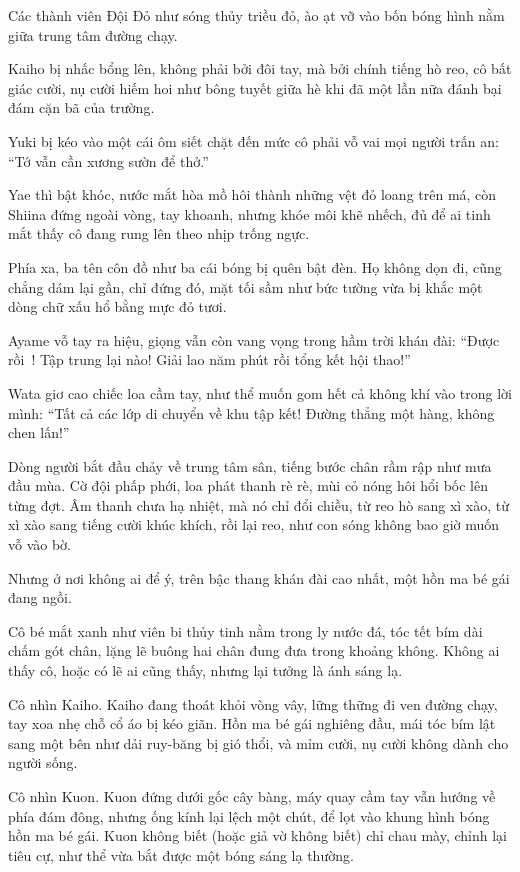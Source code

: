 \documentclass[../main.tex]{subfiles}
\begin{document}
Các thành viên Đội Đỏ như sóng thủy triều đỏ, ào ạt vỡ vào bốn bóng hình nằm giữa trung tâm đường chạy.

Kaiho bị nhấc bổng lên, không phải bởi đôi tay, mà bởi chính tiếng hò reo, cô bất giác cười, nụ cười hiếm hoi như bông tuyết giữa hè khi đã một lần nữa đánh bại đám cặn bã của trường.

Yuki bị kéo vào một cái ôm siết chặt đến mức cô phải vỗ vai mọi người trấn an: ``Tớ vẫn cần xương sườn để thở.''

Yae thì bật khóc, nước mắt hòa mồ hôi thành những vệt đỏ loang trên má, còn Shiina đứng ngoài vòng, tay khoanh, nhưng khóe môi khẽ nhếch, đủ để ai tinh mắt thấy cô đang rung lên theo nhịp trống ngực.

Phía xa, ba tên côn đồ như ba cái bóng bị quên bật đèn. Họ không dọn đi, cũng chẳng dám lại gần, chỉ đứng đó, mặt tối sầm như bức tường vừa bị khắc một dòng chữ xấu hổ bằng mực đỏ tươi.

Ayame vỗ tay ra hiệu, giọng vẫn còn vang vọng trong hầm trời khán đài: ``Được rồi~! Tập trung lại nào! Giải lao năm phút rồi tổng kết hội thao!''

Wata giơ cao chiếc loa cầm tay, như thể muốn gom hết cả không khí vào trong lời mình: ``Tất cả các lớp di chuyển về khu tập kết! Đường thẳng một hàng, không chen lấn!''

Dòng người bắt đầu chảy về trung tâm sân, tiếng bước chân rầm rập như mưa đầu mùa. Cờ đội phấp phới, loa phát thanh rè rè, mùi cỏ nóng hôi hổi bốc lên từng đợt. Âm thanh chưa hạ nhiệt, mà nó chỉ đổi chiều, từ reo hò sang xì xào, từ xì xào sang tiếng cười khúc khích, rồi lại reo, như con sóng không bao giờ muốn vỗ vào bờ.

\il

Nhưng ở nơi không ai để ý,
trên bậc thang khán đài cao nhất,
một hồn ma bé gái đang ngồi.

Cô bé mắt xanh như viên bi thủy tinh nằm trong ly nước đá, tóc tết bím dài chấm gót chân, lặng lẽ buông hai chân đung đưa trong khoảng không.
Không ai thấy cô, hoặc có lẽ ai cũng thấy, nhưng lại tưởng là ánh sáng lạ.

Cô nhìn Kaiho.
Kaiho đang thoát khỏi vòng vây, lững thững đi ven đường chạy, tay xoa nhẹ chỗ cổ áo bị kéo giãn.
Hồn ma bé gái nghiêng đầu, mái tóc bím lật sang một bên như dải ruy-băng bị gió thổi, và mỉm cười, nụ cười không dành cho người sống.

Cô nhìn Kuon.
Kuon đứng dưới gốc cây bàng, máy quay cầm tay vẫn hướng về phía đám đông, nhưng ống kính lại lệch một chút, để lọt vào khung hình bóng hồn ma bé gái.
Kuon không biết (hoặc giả vờ không biết) chỉ chau mày, chỉnh lại tiêu cự, như thể vừa bắt được một bóng sáng lạ thường.
\end{document}
